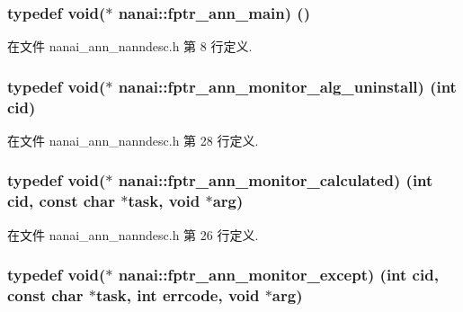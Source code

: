 \subsubsection[{fptr\+\_\+ann\+\_\+main}]{\setlength{\rightskip}{0pt plus 5cm}typedef void($\ast$ nanai\+::fptr\+\_\+ann\+\_\+main) ()}\label{namespacenanai_a3be739c74db7d7304ff72dbcefbdc046}


在文件 nanai\+\_\+ann\+\_\+nanndesc.\+h 第 8 行定义.

\hypertarget{namespacenanai_a04b231ce428a771ab1a9aace53be65c6}{}
\subsubsection[{fptr\+\_\+ann\+\_\+monitor\+\_\+alg\+\_\+uninstall}]{\setlength{\rightskip}{0pt plus 5cm}typedef void($\ast$ nanai\+::fptr\+\_\+ann\+\_\+monitor\+\_\+alg\+\_\+uninstall) (int cid)}\label{namespacenanai_a04b231ce428a771ab1a9aace53be65c6}


在文件 nanai\+\_\+ann\+\_\+nanndesc.\+h 第 28 行定义.

\hypertarget{namespacenanai_afc00080af95a1dc2349880f03d7d6a88}{}
\subsubsection[{fptr\+\_\+ann\+\_\+monitor\+\_\+calculated}]{\setlength{\rightskip}{0pt plus 5cm}typedef void($\ast$ nanai\+::fptr\+\_\+ann\+\_\+monitor\+\_\+calculated) (int cid, const char $\ast$task, void $\ast$arg)}\label{namespacenanai_afc00080af95a1dc2349880f03d7d6a88}


在文件 nanai\+\_\+ann\+\_\+nanndesc.\+h 第 26 行定义.

\hypertarget{namespacenanai_ad9527fac6e647a6c149e4f9a8681e4c1}{}
\subsubsection[{fptr\+\_\+ann\+\_\+monitor\+\_\+except}]{\setlength{\rightskip}{0pt plus 5cm}typedef void($\ast$ nanai\+::fptr\+\_\+ann\+\_\+monitor\+\_\+except) (int cid, const char $\ast$task, int {\bf errcode}, void $\ast$arg)}\label{namespacenanai_ad9527fac6e647a6c149e4f9a8681e4c1}


